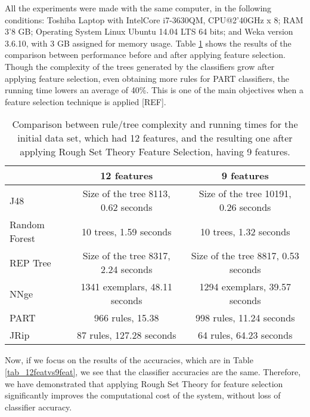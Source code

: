 \documentclass{llncs}
\begin{document}
All the experiments were made with the same computer, in the following conditions: Toshiba Laptop with Intel\texttrademark  Core i7-3630QM, CPU@2'40GHz x 8; RAM 3'8 GB; Operating System Linux Ubuntu 14.04 LTS 64 bits; and Weka version 3.6.10, with 3 GB assigned for memory usage. Table \ref{tab_runningtimes} shows the results of the comparison between performance before and after applying feature selection. Though the complexity of the trees generated by the classifiers grow after applying feature selection, even obtaining more rules for PART classifiers, the running time lowers an average of 40\%. This is one of the main objectives when a feature selection technique is applied [REF].

\begin{table}[htpb]
\centering
 \caption{\label{tab_runningtimes} Comparison between rule/tree complexity and running times for the initial data set, which had 12 features, and the resulting one after applying Rough Set Theory Feature Selection, having 9 features.}
{\small
\begin{tabular}{|l|c|c|}
\cline{2-3}
\multicolumn{1}{l|}{} & 12 features & 9 features \\ 
\hline
J48 & Size of the tree 8113, 0.62 seconds & Size of the tree 10191, 0.26 seconds \\ 
\cline{1-1}
Random Forest & 10 trees, 1.59 seconds & 10 trees, 1.32 seconds \\
\cline{1-1}
REP Tree & Size of the tree 8317, 2.24 seconds & Size of the tree 8817, 0.53 seconds \\ 
\cline{1-1}
NNge & 1341 exemplars, 48.11 seconds & 1294 exemplars, 39.57 seconds \\ 
\cline{1-1}
PART & 966 rules, 15.38 & 998 rules, 11.24 seconds \\ 
\cline{1-1}
JRip & 87 rules, 127.28 seconds & 64 rules, 64.23 seconds \\ 
\hline
\end{tabular}
}
\end{table}

Now, if we focus on the results of the accuracies, which are in Table \ref{tab_12featvs9feat}, we see that the classifier accuracies are the same. Therefore, we have demonstrated that applying Rough Set Theory for feature selection significantly improves the computational cost of the system, without loss of classifier accuracy.
\end{document}
